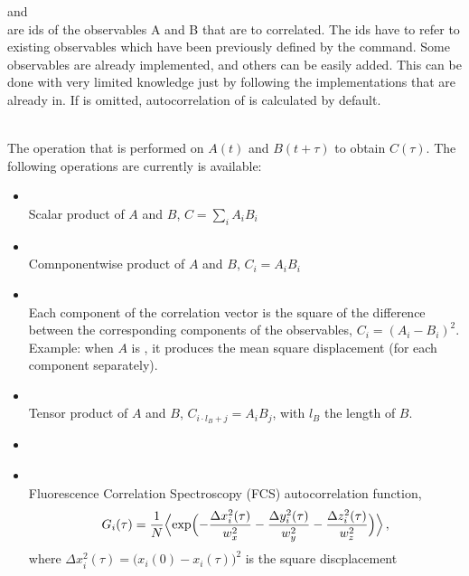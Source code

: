 \begin{arguments}
\item {} and  \\ 
  are ids of the observables A and B that are to correlated. The ids have to refer to existing 
  observables which have been previously defined by the  command.
  Some observables are already implemented, and others can be easily added. This can be done
  with very limited \es{} knowledge just by following the implementations that are already
  in. If  is omitted, autocorrelation of  is calculated by default.
\item {} \\
  The operation that is performed on $A(t)$ and $B(t+\tau)$ to obtain $C(\tau)$. 
  The following operations are currently is available:
  \begin{itemize}
    \item {} \\
    Scalar product of $A$ and $B$, \ie $C=\sum\limits_{i} A_i B_i$
    \item {} \\
    Comnponentwise product of $A$ and $B$, \ie $C_i = A_i B_i$
    \item {} \\
    Each component of the correlation vector is the square of the difference between the 
    corresponding components of the observables, \ie $C_i = (A_i-B_i)^2$. 
    Example: when $A$ is , it produces the mean square displacement
    (for each component separately).
    \item {} \\
    Tensor product of $A$ and $B$, \ie $C_{i \cdot l_B + j} = A_i B_j$, with $l_B$ the length of $B$.
    \item {}
    \item {}   \\
    Fluorescence Correlation Spectroscopy (FCS) autocorrelation function, \ie
    \begin{equation}
    G_i(\tau) = \frac{1}{N} \Bigl< \exp \Bigl( - \frac{\Delta x_i^2(\tau) }{w_x^2} - \frac{\Delta y_i^2(\tau)}{w_y^2} - \frac{\Delta z_i^2(\tau)}{w_z^2} \Bigr) \Bigr>\,,
    \label{eq:Gtau}
    \end{equation}
    where $\Delta x_i^2(\tau) = \bigl(x_i(0) - x_i(\tau) \bigr)^2$ is the square discplacement 

\end{itemize}
\end{arguments}
